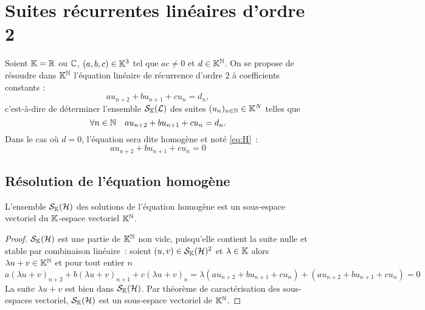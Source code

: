\section{Suites récurrentes linéaires d'ordre 2}

Soient \(\mathbb{K}=\mathbb{R}\) ou \(\mathbb{C}\), \((a,b,c) \in \mathbb{K}^3\) tel que \(ac \neq 0\) et \(d \in \mathbb{K}^{\mathbb{N}}\). On se propose de résoudre dans \(\mathbb{K}^{\mathbb{N}}\) l'équation linéaire de récurrence d'ordre 2 à coefficients constants :
\begin{equation}
  au_{n+2}+bu_{n+1}+cu_n = d_n \label{eq:S} \tag{\(\Lb\)},
\end{equation}
c'est-à-dire de déterminer l'ensemble \(\mathcal{S}_{\mathbb{K}}(\mathcal{L})\) des suites \((u_n)_{n \in \mathbb{N}} \in \mathbb{K}^N\) telles que
\begin{equation}
  \forall n \in \mathbb{N} \quad au_{n+2}+bu_{n+1}+cu_n = d_n.
\end{equation}
Dans le cas où \(d=0\), l'équation sera dite homogène et noté \eqref{eq:H}~:
\begin{equation}
  au_{n+2}+bu_{n+1}+cu_n = 0 \label{eq:H} \tag{\(\H\)}
\end{equation}

\subsection{Résolution de l'équation homogène}

\begin{prop}
  L'ensemble \(\mathcal{S}_{\mathbb{K}}(\mathcal{H})\) des solutions de l'équation homogène est un sous-espace vectoriel du \(\mathbb{K}\)-espace vectoriel \(\mathbb{K}^{\mathbb{N}}\).
\end{prop}
\begin{proof}
  \(\mathcal{S}_{\mathbb{K}}(\mathcal{H})\) est une partie de \(\mathbb{K}^{\mathbb{N}}\) non vide, puisqu'elle contient la suite nulle et stable par combinaison linéaire~:
  soient \((u,v) \in \mathcal{S}_{\mathbb{K}}(\mathcal{H})^2\) et \(\lambda \in \mathbb{K}\) alors \(\lambda u +v \in \mathbb{K}^{\mathbb{N}}\) et pour tout entier \(n\)
  \begin{equation}
    a(\lambda u+v)_{n+2} +b(\lambda u+v)_{n+1} +c(\lambda u+v)_n = \lambda (au_{n+2}+bu_{n+1}+cu_n) + (au_{n+2}+bu_{n+1}+cu_n)=0
  \end{equation}
  La suite \(\lambda u+v\) est bien dans \(\mathcal{S}_{\mathbb{K}}(\mathcal{H})\). Par théorème de caractérisation des sous-espaces vectoriel, \(\mathcal{S}_{\mathbb{K}}(\mathcal{H})\) est un sous-espace vectoriel de \(\mathbb{K}^{\mathbb{N}}\).
\end{proof}

